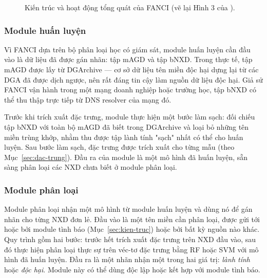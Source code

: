 \begin{figure}[H]
\caption{Kiến trúc và hoạt động tổng quát của FANCI (vẽ lại Hình 3 của \cite{schuppen2018fanci}).}
\label{fig:kien-truc-fanci}
\end{figure}

\subsubsection{Module huấn luyện}

Vì FANCI dựa trên bộ phân loại học có giám sát, module huấn luyện cần đầu vào là dữ liệu đã được gán nhãn: tập mAGD và tập bNXD. Trong thực tế, tập mAGD được lấy từ DGArchive \cite{dgarchive} --- cơ sở dữ liệu tên miền độc hại dựng lại từ các DGA đã được dịch ngược, nên rất đáng tin cậy làm nguồn dữ liệu độc hại. Giả sử FANCI vận hành trong một mạng doanh nghiệp hoặc trường học, tập bNXD có thể thu thập trực tiếp từ DNS resolver của mạng đó.

Trước khi trích xuất đặc trưng, module thực hiện một bước làm sạch: đối chiếu tập bNXD với toàn bộ mAGD đã biết trong DGArchive và loại bỏ những tên miền trùng khớp, nhằm thu được tập lành tính "sạch" nhất có thể cho huấn luyện. Sau bước làm sạch, đặc trưng được trích xuất cho từng mẫu (theo Mục~\ref{sec:dac-trung}). Đầu ra của module là một mô hình đã huấn luyện, sẵn sàng phân loại các NXD chưa biết ở module phân loại.

\subsubsection{Module phân loại}

Module phân loại nhận một mô hình từ module huấn luyện và dùng nó để gán nhãn cho từng NXD đơn lẻ. Đầu vào là một tên miền cần phân loại, được gửi tới hoặc bởi module tình báo (Mục~\ref{sec:kien-truc}) hoặc bởi bất kỳ nguồn nào khác. Quy trình gồm hai bước: trước hết trích xuất đặc trưng trên NXD đầu vào, sau đó thực hiện phân loại thực sự trên véc-tơ đặc trưng bằng RF hoặc SVM với mô hình đã huấn luyện. Đầu ra là một nhãn nhận một trong hai giá trị: \textit{lành tính} hoặc \textit{độc hại}. Module này có thể dùng độc lập hoặc kết hợp với module tình báo.

